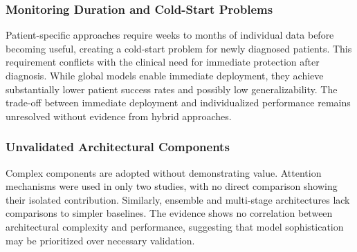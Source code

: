 \subsubsection{Monitoring Duration and Cold-Start Problems}

Patient-specific approaches require weeks to months of individual data before becoming useful, creating a cold-start problem for newly diagnosed patients. This requirement conflicts with the clinical need for immediate protection after diagnosis. While global models enable immediate deployment, they achieve substantially lower patient success rates and possibly low generalizability. The trade-off between immediate deployment and individualized performance remains unresolved without evidence from hybrid approaches.

\subsubsection{Unvalidated Architectural Components}

Complex components are adopted without demonstrating value. Attention mechanisms were used in only two studies, with no direct comparison showing their isolated contribution. Similarly, ensemble and multi-stage architectures lack comparisons to simpler baselines. The evidence shows no correlation between architectural complexity and performance, suggesting that model sophistication may be prioritized over necessary validation.